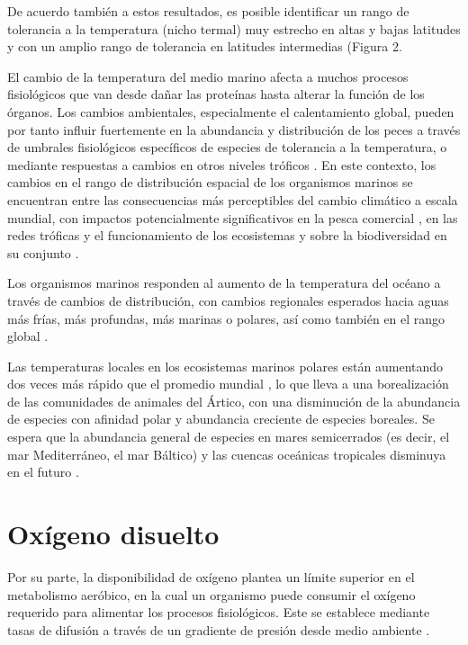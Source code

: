 \documentclass{sydneythesis}
\begin{document}
De acuerdo también a estos resultados, es posible identificar un rango de tolerancia a la temperatura (nicho termal) muy estrecho en altas y bajas latitudes y con un amplio rango de tolerancia en latitudes intermedias (Figura 2.

El cambio de la temperatura del medio marino afecta a muchos procesos fisiológicos que van desde dañar las proteínas hasta alterar la función de los órganos. Los cambios ambientales, especialmente el calentamiento global, pueden por tanto influir fuertemente en la abundancia y distribución de los peces a través de umbrales fisiológicos específicos de especies de tolerancia a la temperatura, o mediante respuestas a cambios en otros niveles tróficos \autocite{Perry2005,Rijnsdorp2009,Saba2014}. En este contexto, los cambios en el rango de distribución espacial de los organismos marinos se encuentran entre las consecuencias más perceptibles del cambio climático a escala mundial, con impactos potencialmente significativos en la pesca comercial \autocite{Perry2005,Barange2014}, en las redes tróficas y el funcionamiento de los ecosistemas y sobre la biodiversidad en su conjunto \autocite{Pinsky2020}.

Los organismos marinos responden al aumento de la temperatura del océano a través de cambios de distribución, con cambios regionales esperados hacia aguas más frías, más profundas, más marinas o polares, así como también en el rango global \autocite{Cheung2010a,Pinsky2020,Frawley2019}.

Las temperaturas locales en los ecosistemas marinos polares están aumentando dos veces más rápido que el promedio mundial \autocite{IPCC2014}, lo que lleva a una borealización de las comunidades de animales del Ártico, con una disminución de la abundancia de especies con afinidad polar y abundancia creciente de especies boreales. Se espera que la abundancia general de especies en mares semicerrados (es decir, el mar Mediterráneo, el mar Báltico) y las cuencas oceánicas tropicales disminuya en el futuro \autocite{Cheung2013}.

\pagebreak

\hypertarget{oxuxedgeno-disuelto}{%
\section{Oxígeno disuelto}\label{oxuxedgeno-disuelto}}

Por su parte, la disponibilidad de oxígeno plantea un límite superior en el metabolismo aeróbico, en la cual un organismo puede consumir el oxígeno requerido para alimentar los procesos fisiológicos. Este se establece mediante tasas de difusión a través de un gradiente de presión desde medio ambiente \autocite{Duncan2020}.
\end{document}
